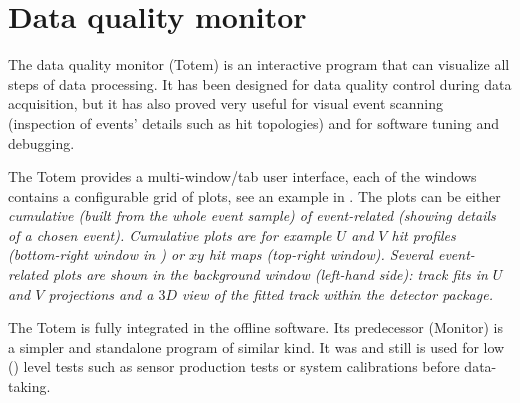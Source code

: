 


\section[dqm]{Data quality monitor}

The data quality monitor (Totem) is an interactive program that can visualize all steps of data processing. It has been designed for data quality control during data acquisition, but it has also proved very useful for visual event scanning (inspection of events' details such as hit topologies) and for software tuning and debugging.


The Totem provides a multi-window/tab user interface, each of the windows contains a configurable grid of plots, see an example in . The plots can be either \em{cumulative} (built from the whole event sample) of \em{event-related} (showing details of a chosen event). Cumulative plots are for example $U$ and $V$ hit profiles (bottom-right window in ) or $xy$ hit maps (top-right window). Several event-related plots are shown in the background window (left-hand side): track fits in $U$ and $V$ projections and a $3D$ view of the fitted track within the detector package.

The Totem is fully integrated in the  offline software. Its predecessor (Monitor) is a simpler and standalone program of similar kind. It was and still is used for low () level tests such as  sensor production tests or system calibrations before data-taking.
